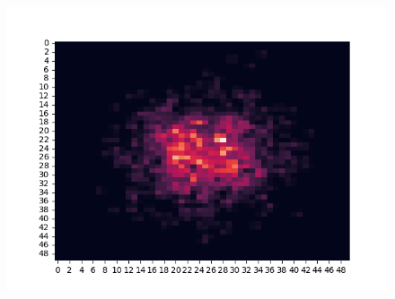 \documentclass{article}
\begin{document}
\begin{figure}
\begin{minipage}{0.95\textwidth}
            \includegraphics[scale=0.7]{../images/second_order.png}
        \end{minipage}
    \end{figure}
\end{document}
